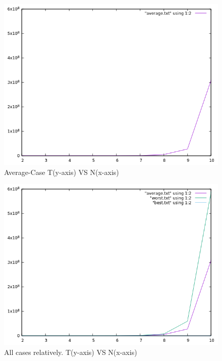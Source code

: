 \documentclass[conference]{IEEEtran}
\begin{document}
\begin{figure}[H]
  \begin{center}
    \includegraphics[scale=0.5]{average.png} 
    \caption{Average-Case T(y-axis) VS N(x-axis) }\label{Saturation}
  \end{center}
\end{figure}

\begin{figure}[H]
  \begin{center}
    \includegraphics[scale=0.5]{relative.png} 
    \caption{All cases relatively. T(y-axis) VS N(x-axis) }\label{Saturation}
  \end{center}
\end{figure}
\end{document}
